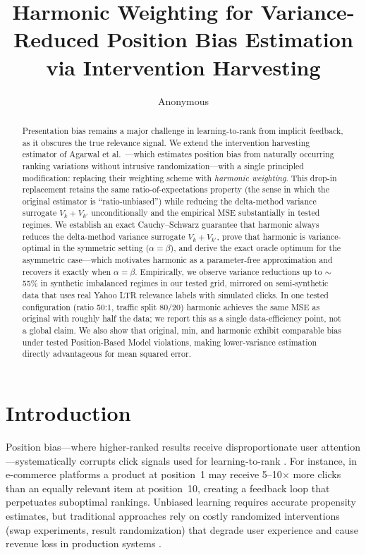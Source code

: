 \documentclass[sigconf]{acmart}
\title{Harmonic Weighting for Variance-Reduced Position Bias Estimation via Intervention Harvesting}
\author{Anonymous}
\affiliation{%
  \institution{Anonymous}
  \country{}}
\begin{document}
\begin{abstract}
Presentation bias remains a major challenge in learning-to-rank from implicit feedback, as it obscures the true relevance signal. We extend the intervention harvesting estimator of Agarwal et al.~\cite{agarwal2019estimating}---which estimates position bias from naturally occurring ranking variations without intrusive randomization---with a single principled modification: replacing their weighting scheme with \emph{harmonic weighting}. This drop-in replacement retains the same ratio-of-expectations property (the sense in which the original estimator is ``ratio-unbiased'') while reducing the delta-method variance surrogate $V_k+V_{k'}$ unconditionally and the empirical MSE substantially in tested regimes. We establish an exact Cauchy–Schwarz guarantee that harmonic always reduces the delta-method variance surrogate $V_k+V_{k'}$, prove that harmonic is variance-optimal in the symmetric setting ($\alpha=\beta$), and derive the exact oracle optimum for the asymmetric case---which motivates harmonic as a parameter-free approximation and recovers it exactly when $\alpha=\beta$. Empirically, we observe variance reductions up to $\sim$55\% in synthetic imbalanced regimes
in our tested grid, mirrored on semi-synthetic data that uses real Yahoo LTR relevance labels
with simulated clicks. In one tested configuration (ratio 50:1, traffic split 80/20) harmonic
achieves the same MSE as original with roughly half the data; we report this as a single
data-efficiency point, not a global claim. We also show that original, min, and harmonic exhibit comparable bias under tested Position-Based Model violations, making lower-variance estimation directly advantageous for mean squared error.
\end{abstract}

\maketitle

\section{Introduction}
\label{sec:introduction}

Position bias—where higher-ranked results receive disproportionate user attention—systematically corrupts click signals used for learning-to-rank \cite{joachims2017unbiased}. For instance, in e-commerce platforms a product at position~1 may receive 5--10$\times$ more clicks than an equally relevant item at position~10, creating a feedback loop that perpetuates suboptimal rankings. Unbiased learning requires accurate propensity estimates, but traditional approaches rely on costly randomized interventions (swap experiments, result randomization) that degrade user experience and cause revenue loss in production systems \cite{joachims2017unbiased, wang2018position}.
\end{document}
